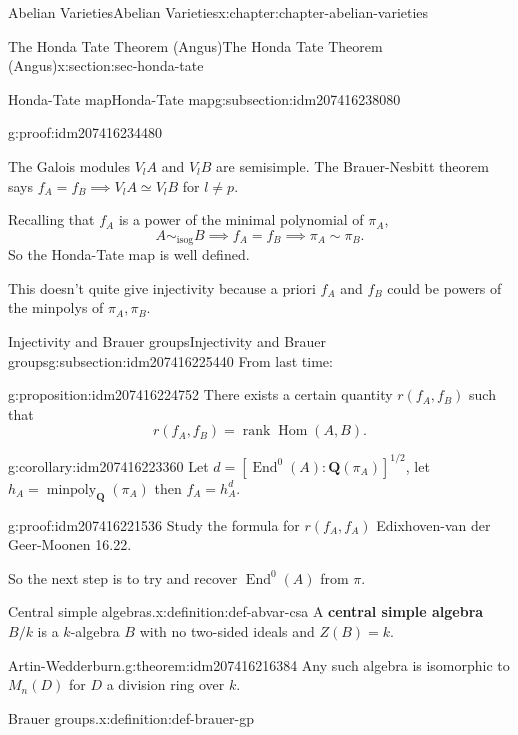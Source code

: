 \documentclass[oneside,10pt,]{book}
\newcommand{\terminology}[1]{\textbf{#1}}
\numberwithin{equation}{section}
\newcommand{\lb}{[}
\newcommand{\rb}{]}
\newcommand{\QQ}{\mathbf{Q}}
\DeclareMathOperator{\End}{End}
\DeclareMathOperator{\Hom}{Hom}
\DeclareMathOperator{\rank}{rank}
\begin{document}
\begin{chapterptx}{Abelian Varieties}{}{Abelian Varieties}{}{}{x:chapter:chapter-abelian-varieties}
\begin{sectionptx}{The Honda Tate Theorem (Angus)}{}{The Honda Tate Theorem (Angus)}{}{}{x:section:sec-honda-tate}
\begin{subsectionptx}{Honda-Tate map}{}{Honda-Tate map}{}{}{g:subsection:idm207416238080}
\begin{proofptx}{}{g:proof:idm207416234480}
\par
The Galois modules \(V_lA\) and \(V_l B\) are semisimple. The Brauer-Nesbitt theorem says \(f_A = f_B \implies V_lA \simeq V_lB \) for \(l\ne p\).%
\end{proofptx}
Recalling that \(f_A\) is a power of the minimal polynomial of \(\pi_A\),%
\begin{equation*}
A \sim_{\text{isog}} B\implies  f_A =f_B \implies \pi_A \sim \pi_B\text{.}
\end{equation*}
So the Honda-Tate map is well defined.%
\par
This doesn't quite give injectivity because a priori \(f_A\) and \(f_B\) could be powers of the minpolys of \(\pi_A, \pi_B\).%
\end{subsectionptx}
%
%
\typeout{************************************************}
\typeout{************************************************}
%
\begin{subsectionptx}{Injectivity and Brauer groups}{}{Injectivity and Brauer groups}{}{}{g:subsection:idm207416225440}
From last time:%
\begin{proposition}{}{}{g:proposition:idm207416224752}%
There exists a certain quantity \(r(f_A, f_B)\) such that%
\begin{equation*}
r(f_A, f_B) = \rank \Hom(A,B)\text{.}
\end{equation*}
%
\end{proposition}
\begin{corollary}{}{}{g:corollary:idm207416223360}%
Let \(d = \lb \End^0(A) : \QQ(\pi_A) \rb^{1/2}\), let \(h_A = \operatorname{minpoly}_\QQ(\pi_A)\) then \(f_A = h_A^d\).%
\end{corollary}
\begin{proofptx}{}{g:proof:idm207416221536}
Study the formula for \(r(f_A, f_A)\) Edixhoven-van der Geer-Moonen 16.22.%
\end{proofptx}
So the next step is to try and recover \(\End^0(A)\) from \(\pi\).%
\begin{definition}{Central simple algebras.}{x:definition:def-abvar-csa}%
A \terminology{central simple algebra} \(B/k\) is a \(k\)-algebra \(B\) with no two-sided ideals and \(Z(B) = k\).%
\end{definition}
\begin{theorem}{Artin-Wedderburn.}{}{g:theorem:idm207416216384}%
Any such algebra is isomorphic to \(M_n(D)\) for \(D\) a division ring over \(k\).%
\end{theorem}
\begin{definition}{Brauer groups.}{x:definition:def-brauer-gp}%

\end{definition}
\end{subsectionptx}
\end{sectionptx}
\end{chapterptx}
\end{document}
